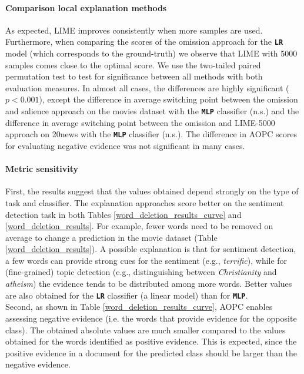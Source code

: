 \documentclass[11pt,a4paper]{article}
\begin{document}
\paragraph*{Comparison local explanation methods} 
As expected, LIME  improves consistently when  more samples are used.
Furthermore, when comparing the scores of the omission approach for the  \textbf{\texttt{LR}} model (which corresponds to the ground-truth) we observe that LIME with 5000 samples comes  close to the optimal score. We use the two-tailed paired permutation test to test for significance between all methods with both evaluation measures. In almost all cases, the differences are highly significant ($p<0.001$), except the difference in  average switching point between the omission and salience approach on the movies dataset with  the \textbf{\texttt{MLP}} classifier (n.s.) and the difference in average switching point between the omission and LIME-5000 approach on 20news with the \textbf{\texttt{MLP}} classifier (n.s.). The difference in  AOPC scores for evaluating negative evidence was not significant in many cases.




\paragraph*{Metric sensitivity}
First, the results suggest that the values obtained depend strongly on the type of  task and classifier. The explanation approaches score better on the sentiment detection task in 
 both Tables \ref{word_deletion_results_curve} and \ref{word_deletion_results}. For example, fewer words need to be removed on average to change a prediction in the movie dataset (Table \ref{word_deletion_results}).
A possible explanation is that for sentiment detection, a few words can provide strong cues for the sentiment (e.g., \emph{terrific}), while for (fine-grained) topic detection (e.g., distinguishing between
\textit{Christianity} and \textit{atheism}) the evidence tends to be distributed among more words.
 Better values are also obtained for the  \textbf{\texttt{LR}} classifier (a linear model) than for \textbf{\texttt{MLP}}.\\

Second, as shown in Table \ref{word_deletion_results_curve},  AOPC enables assessing negative evidence (i.e. the words that provide evidence for the opposite class). The  obtained absolute values are much smaller compared to the values obtained for the words identified as positive evidence. This is expected, since 
the positive evidence in a document for the predicted class should be larger than the negative evidence.
 
\end{document}
